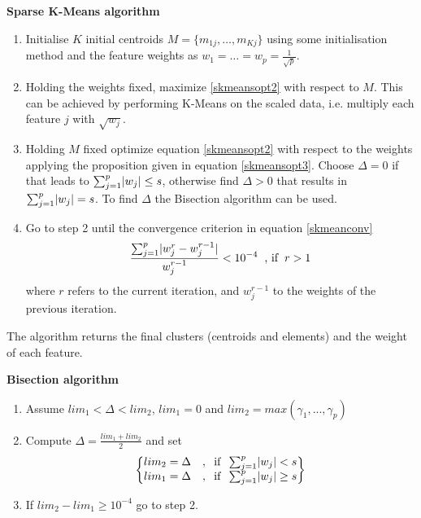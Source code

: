 \documentclass[12pt]{article}
\DeclarePairedDelimiter{\abs}{\lvert}{\rvert} %
\begin{document}
\begin{center}
	\begin{tcolorbox}[breakable,colback=white!100!white,colframe=black!100!black]
		\noindent\textbf{Sparse K-Means algorithm}
		\begin{enumerate}
			\item Initialise $K$ initial centroids $M = \{m_{1j}, \dots, m_{Kj}\}$ using some initialisation method and the feature weights as $w_{1} = \dots = w_{p} = \frac{1}{\sqrt{p}}$.
			\item Holding the weights fixed, maximize \ref{skmeansopt2} with respect to $M$. This can be achieved by performing K-Means on the scaled data, i.e. multiply each feature $j$ with $\sqrt{w_j}$.	
			\item Holding $M$ fixed optimize equation \ref{skmeansopt2} with respect to the weights applying the proposition given in equation \ref{skmeansopt3}. Choose $\Delta = 0$ if that leads to $\sum_{j=1}^{p} \abs{w_{j}} \leq s$, otherwise find $\Delta > 0$ that results in $\sum_{j=1}^{p} \abs{w_{j}} = s$. To find $\Delta$ the Bisection algorithm can be used.
			\item Go to step 2 until the convergence criterion in equation \ref{skmeanconv}
			\begin{align}\label{skmeanconv}
			\frac{ \sum_{j=1}^{p}\abs{w_{j}^{r}-w_{j}^{r-1}} }{ w_{j}^{r-1} } < 10^{-4} \hphantom{x}\text{, if}\hphantom{x}r > 1
			\end{align}	
			where $r$ refers to the current iteration, and $w_{j}^{r-1}$ to the weights of the previous iteration.
		\end{enumerate}	
		The algorithm returns the final clusters (centroids and elements) and the weight of each feature.		
		
		\vspace{1.0cm}
		
		\noindent\textbf{Bisection algorithm}
		\begin{enumerate}
			\item Assume $lim_1 < \Delta < lim_2$, $lim_1 = 0$ and $lim_2 = max(\gamma_1,...,\gamma_p)$
			
			\item Compute $\Delta = \frac{lim_1+lim_2}{2}$ and set
			\begin{align}\nonumber
			\begin{Bmatrix}
			lim_2 = \Delta
			&,\hphantom{x  } \text{if} \hphantom{x } \sum_{j=1}^{p} \abs{w_{j}} < s \\
			lim_1 = \Delta
			&,\hphantom{x  } \text{if} \hphantom{x } \sum_{j=1}^{p} \abs{w_{j}} \geq s
			\end{Bmatrix}
			\end{align}	
			
			\item If $lim_2-lim_1 \geq 10^{-4}$ go to step 2.
		\end{enumerate}
	\end{tcolorbox}
\end{center}
\end{document}

